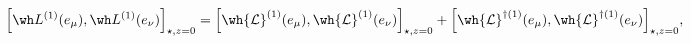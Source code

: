 \begin{equation}
\Big[\wh L^{(1)}(e_\mu),\wh L^{(1)}(e_\nu)\Big]_{\star,z=0} =
\Big[\wh{\mathcal{L}}^{(1)}(e_\mu),
\wh{\mathcal{L}}^{(1)}(e_\nu)\Big]_{\star,z=0} + 
\Big[\wh{\mathcal{L}}^{\dagger(1)}(e_\mu),
\wh{\mathcal{L}}^{\dagger(1)}(e_\nu)\Big]_{\star,z=0},
\label{eq:L1L1}
\end{equation}

